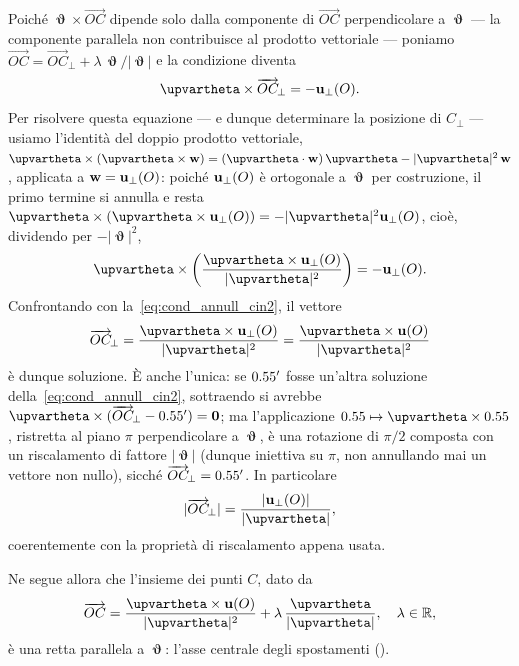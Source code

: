 Poiché $\bm{\upvartheta} \times \overrightarrow{OC}$ dipende
solo dalla componente di $\overrightarrow{OC}$ perpendicolare a
$\bm{\upvartheta}$ --- la componente parallela non contribuisce
al prodotto vettoriale --- poniamo
$\overrightarrow{OC} = \overrightarrow{OC}_{\!\perp}
+ \lambda\,\bm{\upvartheta}/|\bm{\upvartheta}|$
e la condizione diventa
\begin{equation}\label{eq:cond_annull_cin2}
	\bm{\upvartheta} \times \overrightarrow{OC}_{\!\perp}
	= -\ub_{\perp}(O).
\end{equation}
Per risolvere questa equazione --- e dunque determinare la posizione di $C_\perp$ --- usiamo l'identità del doppio
prodotto vettoriale,
$\bm{\upvartheta}\times(\bm{\upvartheta}\times\wb)
= (\bm{\upvartheta}\cdot\wb)\,\bm{\upvartheta} - |\bm{\upvartheta}|^2\,\wb$,
applicata a $\mathbf{w}=\mathbf{u}_\perp(O)$: poiché $\mathbf{u}_\perp(O)$ è
ortogonale a $\bm{\upvartheta}$ per costruzione, il primo
termine si annulla e resta
$\bm{\upvartheta}\times(\bm{\upvartheta}\times\ub_\perp(O))
= -|\bm{\upvartheta}|^2\ub_\perp(O)$, cioè, dividendo per
$-|\bm{\upvartheta}|^2$,
\begin{equation}
	\bm{\upvartheta}\times\left(\frac{\bm{\upvartheta}\times\ub_\perp(O)}{|\bm{\upvartheta}|^2}\right)
	= -\ub_\perp(O).
\end{equation}
Confrontando con la~\eqref{eq:cond_annull_cin2}, il vettore
\begin{equation}\label{eq:OC_perp}
	\overrightarrow{OC}_{\!\perp} = \frac{\bm{\upvartheta}\times\ub_\perp(O)}{|\bm{\upvartheta}|^2}
	= \frac{\bm{\upvartheta}\times\ub(O)}{|\bm{\upvartheta}|^2}
\end{equation}
è dunque soluzione. È anche
l'unica: se $0.55'$ fosse un'altra soluzione
della~\eqref{eq:cond_annull_cin2}, sottraendo si avrebbe
$\bm{\upvartheta}\times(\overrightarrow{OC}_{\!\perp}-\vb')=\mathbf 0$;
ma l'applicazione $\vb\mapsto\bm{\upvartheta}\times\vb$,
ristretta al piano $\pi$ perpendicolare a $\bm{\upvartheta}$, è
una rotazione di $\pi/2$ composta con un riscalamento di
fattore $|\bm{\upvartheta}|$ (dunque iniettiva su $\pi$, non
annullando mai un vettore non nullo), sicché
$\overrightarrow{OC}_{\!\perp}=0.55'$. In particolare
\begin{equation}
	|\overrightarrow{OC}_{\!\perp}| = \frac{|\ub_\perp(O)|}{|\bm{\upvartheta}|},
\end{equation}
coerentemente con la proprietà di riscalamento appena usata.

Ne segue allora che l'insieme dei punti $C$, dato da
\begin{equation}\label{OC}
\overrightarrow{OC}=\frac{\bm{\upvartheta}\times\ub(O)}{|\bm{\upvartheta}|^2}+\lambda\,\frac{\bm\upvartheta}{|\bm\upvartheta|}, \quad \lambda\in \Ro,
\end{equation}
è una retta parallela a $\bm{\upvartheta}$: l'asse centrale degli
spostamenti ().


